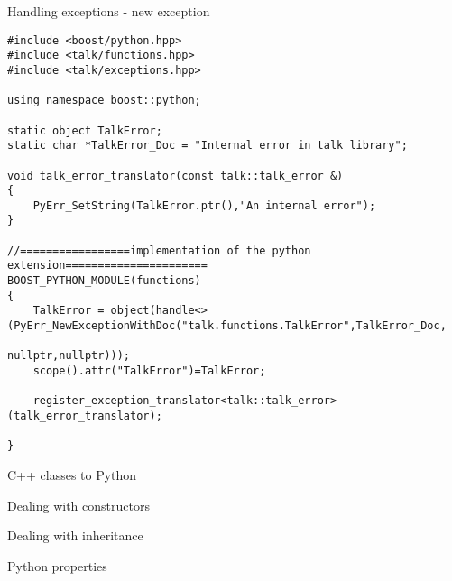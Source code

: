 \begin{frame}[fragile]{Handling exceptions - new exception}

    \begin{verbatim}
#include <boost/python.hpp>
#include <talk/functions.hpp>
#include <talk/exceptions.hpp>

using namespace boost::python;

static object TalkError;
static char *TalkError_Doc = "Internal error in talk library";

void talk_error_translator(const talk::talk_error &)
{
    PyErr_SetString(TalkError.ptr(),"An internal error");
}

//=================implementation of the python extension======================
BOOST_PYTHON_MODULE(functions)
{
    TalkError = object(handle<>(PyErr_NewExceptionWithDoc("talk.functions.TalkError",TalkError_Doc,
                                                          nullptr,nullptr)));
    scope().attr("TalkError")=TalkError;

    register_exception_translator<talk::talk_error>(talk_error_translator);
   
}
    \end{verbatim}
\end{frame}

\begin{frame}[fragile]{C++ classes to Python}
\end{frame}

\begin{frame}[fragile]{Dealing with constructors}
\end{frame}

\begin{frame}[fragile]{Dealing with inheritance}
\end{frame}

\begin{frame}[fragile]{Python properties}
\end{frame}



